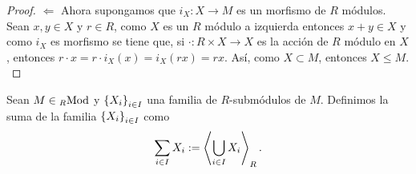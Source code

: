 \documentclass{article}
\begin{document}
\begin{enumerate}[label=\textbf{Ej \arabic*.}]
\begin{proof}
			$\boxed{\Leftarrow}$ Ahora supongamos que  $i_X:X\longrightarrow M$ es un morfismo de $R$ módulos.\\
			
			Sean $x,y\in X$ y $r\in R$, como $X$ es un $R$ módulo a izquierda entonces $x+y\in X$ y como $i_X$ es morfismo
			se tiene que, si $\cdot: R\times X\longrightarrow X$ es la acción de $R$ módulo en $X$, entonces 
			$r\cdot x = r\cdot i_X(x) = i_X(rx)=rx $. Así, como $X\subset M$, entonces $X\leq M$.\\
		\end{proof}
		
		\begin{define}
			Sean $M\in\ringmod{R}{\text{Mod}}{l}$ y ${\left\{{X}_{i}\right\}}_{i\in I}$ una familia de $R$-submódulos de $M$. Definimos la suma de la familia ${\left\{{X}_{i}\right\}}_{i\in I}$ como
			\begin{equation*}
				\sum_{i\in I}X_i:=\left< \bigcup_{i\in I}X_i\right>_R.
			\end{equation*}
		\end{define}
		

\end{enumerate}
\end{document}
